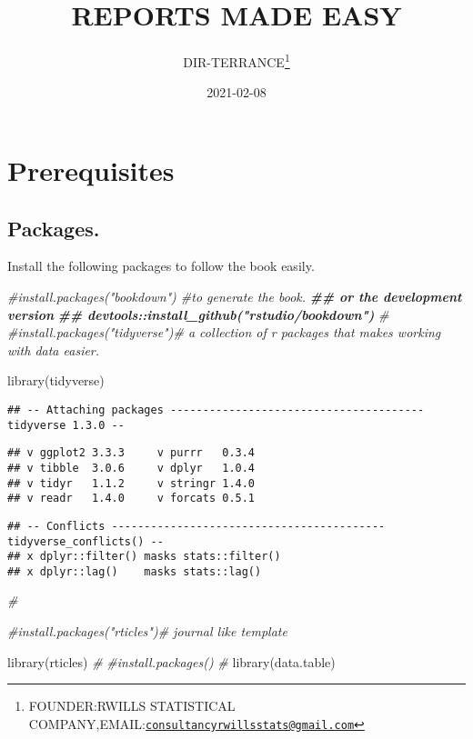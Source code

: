 \documentclass[
]{book}
\title{REPORTS MADE EASY}
\author{DIR-TERRANCE\footnote{FOUNDER:RWILLS STATISTICAL COMPANY,EMAIL:\href{mailto:consultancyrwillsstats@gmail.com}{\nolinkurl{consultancyrwillsstats@gmail.com}}}}
\date{2021-02-08}
\newenvironment{Shaded}{\begin{snugshade}}{\end{snugshade}}
\newcommand{\CommentTok}[1]{\textcolor[rgb]{0.56,0.35,0.01}{\textit{#1}}}
\newcommand{\DocumentationTok}[1]{\textcolor[rgb]{0.56,0.35,0.01}{\textbf{\textit{#1}}}}
\newcommand{\FunctionTok}[1]{\textcolor[rgb]{0.00,0.00,0.00}{#1}}
\newcommand{\NormalTok}[1]{#1}
\begin{document}
\maketitle

{
\setcounter{tocdepth}{1}
\tableofcontents
}
\hypertarget{prerequisites}{%
\chapter*{Prerequisites}\label{prerequisites}}

\hypertarget{packages.}{%
\section{Packages.}\label{packages.}}

Install the following packages to follow the book easily.

\begin{Shaded}
\begin{Highlighting}[]
\CommentTok{\#install.packages("bookdown") \#to generate the book.}
\DocumentationTok{\#\# or the development version}
\DocumentationTok{\#\# devtools::install\_github("rstudio/bookdown")}
\CommentTok{\# }
\CommentTok{\#install.packages("tidyverse")\# a collection of r packages that makes working with data easier.}

\FunctionTok{library}\NormalTok{(tidyverse)}
\end{Highlighting}
\end{Shaded}

\begin{verbatim}
## -- Attaching packages --------------------------------------- tidyverse 1.3.0 --
\end{verbatim}

\begin{verbatim}
## v ggplot2 3.3.3     v purrr   0.3.4
## v tibble  3.0.6     v dplyr   1.0.4
## v tidyr   1.1.2     v stringr 1.4.0
## v readr   1.4.0     v forcats 0.5.1
\end{verbatim}

\begin{verbatim}
## -- Conflicts ------------------------------------------ tidyverse_conflicts() --
## x dplyr::filter() masks stats::filter()
## x dplyr::lag()    masks stats::lag()
\end{verbatim}

\begin{Shaded}
\begin{Highlighting}[]
\CommentTok{\#}

\CommentTok{\#install.packages("rticles")\# journal like template}

\FunctionTok{library}\NormalTok{(rticles)}
\CommentTok{\#}
\CommentTok{\#install.packages()}
\CommentTok{\#}
\FunctionTok{library}\NormalTok{(data.table)}
\end{Highlighting}
\end{Shaded}
\end{document}
